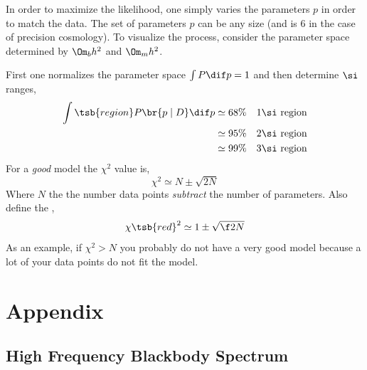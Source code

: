 \documentclass{article}
\begin{document}
In order to maximize the likelihood, one simply varies the parameters $p$ in order to match the data. The set of parameters $p$ can be any size (and is $6$ in the case of precision cosmology). To visualize the process, consider the parameter space determined by $\Om_b h^2$ and $\Om_m h^2$.
\begin{center}
\end{center}
First one normalizes the parameter space $\int P\dif p = 1$ and then determine $\si$ ranges,
\begin{align*}
    \int\tsb{region} P\br{p \mid D} \dif p
    &\simeq 68\% \quad 1\si \text{ region} \\
    &\simeq 95\% \quad 2\si \text{ region} \\
    &\simeq 99\% \quad 3\si \text{ region} \\
\end{align*}
For a \textit{good} model the $\chi^2$ value is,
\[ \chi^2 \simeq N \pm \sqrt{2N} \]
Where $N$ the the number data points \textit{subtract} the number of parameters. Also define the ,
\[ \chi\tsb{red}^2 \simeq 1 \pm \sqrt{\f2N} \]
As an example, if $\chi^2 > N$ you probably do not have a very good model because a lot of your data points do not fit the model.
\newpage
\section*{Appendix}
\setcounter{subsection}{0}
\setcounter{subsubsection}{0}
\renewcommand*{\theHsubsection}{appendix.\the\value{subsection}}
\renewcommand{\thesubsection}{\Alph{subsection}}
\subsection{High Frequency Blackbody Spectrum}
\label{sec:upper_black_body}
\end{document}
